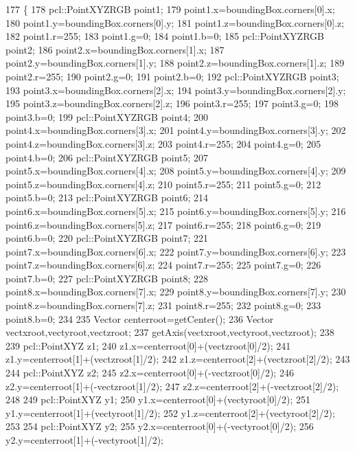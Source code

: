 \begin{DoxyCode}
177 \{
178     pcl::PointXYZRGB point1;
179     point1.x=boundingBox.corners[0].x;
180     point1.y=boundingBox.corners[0].y;
181     point1.z=boundingBox.corners[0].z;
182     point1.r=255;
183     point1.g=0;
184     point1.b=0;
185     pcl::PointXYZRGB point2;
186     point2.x=boundingBox.corners[1].x;
187     point2.y=boundingBox.corners[1].y;
188     point2.z=boundingBox.corners[1].z;
189     point2.r=255;
190     point2.g=0;
191     point2.b=0;
192     pcl::PointXYZRGB point3;
193     point3.x=boundingBox.corners[2].x;
194     point3.y=boundingBox.corners[2].y;
195     point3.z=boundingBox.corners[2].z;
196     point3.r=255;
197     point3.g=0;
198     point3.b=0;
199     pcl::PointXYZRGB point4;
200     point4.x=boundingBox.corners[3].x;
201     point4.y=boundingBox.corners[3].y;
202     point4.z=boundingBox.corners[3].z;
203     point4.r=255;
204     point4.g=0;
205     point4.b=0;
206     pcl::PointXYZRGB point5;
207     point5.x=boundingBox.corners[4].x;
208     point5.y=boundingBox.corners[4].y;
209     point5.z=boundingBox.corners[4].z;
210     point5.r=255;
211     point5.g=0;
212     point5.b=0;
213     pcl::PointXYZRGB point6;
214     point6.x=boundingBox.corners[5].x;
215     point6.y=boundingBox.corners[5].y;
216     point6.z=boundingBox.corners[5].z;
217     point6.r=255;
218     point6.g=0;
219     point6.b=0;
220     pcl::PointXYZRGB point7;
221     point7.x=boundingBox.corners[6].x;
222     point7.y=boundingBox.corners[6].y;
223     point7.z=boundingBox.corners[6].z;
224     point7.r=255;
225     point7.g=0;
226     point7.b=0;
227     pcl::PointXYZRGB point8;
228     point8.x=boundingBox.corners[7].x;
229     point8.y=boundingBox.corners[7].y;
230     point8.z=boundingBox.corners[7].z;
231     point8.r=255;
232     point8.g=0;
233     point8.b=0;
234 
235     Vector centerroot=getCenter();
236     Vector vectxroot,vectyroot,vectzroot;
237     getAxis(vectxroot,vectyroot,vectzroot);
238 
239     pcl::PointXYZ z1;
240     z1.x=centerroot[0]+(vectzroot[0]/2);
241     z1.y=centerroot[1]+(vectzroot[1]/2);
242     z1.z=centerroot[2]+(vectzroot[2]/2);
243 
244     pcl::PointXYZ z2;
245     z2.x=centerroot[0]+(-vectzroot[0]/2);
246     z2.y=centerroot[1]+(-vectzroot[1]/2);
247     z2.z=centerroot[2]+(-vectzroot[2]/2);
248 
249     pcl::PointXYZ y1;
250     y1.x=centerroot[0]+(vectyroot[0]/2);
251     y1.y=centerroot[1]+(vectyroot[1]/2);
252     y1.z=centerroot[2]+(vectyroot[2]/2);
253 
254     pcl::PointXYZ y2;
255     y2.x=centerroot[0]+(-vectyroot[0]/2);
256     y2.y=centerroot[1]+(-vectyroot[1]/2);

\end{DoxyCode}
